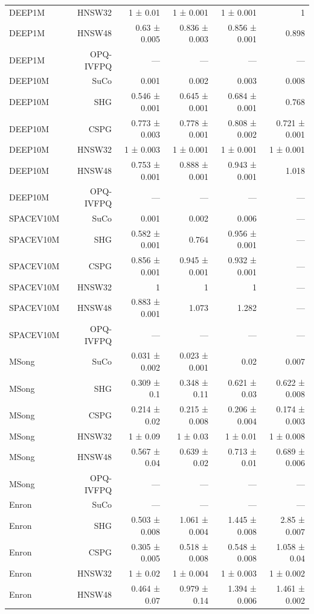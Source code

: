 \begin{table}[t]
\begin{tabular}{lrrrrr}
DEEP1M & HNSW32 & 1 ± 0.01 & 1 ± 0.001 & 1 ± 0.001 & 1 \\
DEEP1M & HNSW48 & 0.63 ± 0.005 & 0.836 ± 0.003 & 0.856 ± 0.001 & 0.898 \\
DEEP1M & OPQ-IVFPQ & — & — & — & — \\
DEEP10M & SuCo & 0.001 & 0.002 & 0.003 & 0.008 \\
DEEP10M & SHG & 0.546 ± 0.001 & 0.645 ± 0.001 & 0.684 ± 0.001 & 0.768 \\
DEEP10M & CSPG & 0.773 ± 0.003 & 0.778 ± 0.001 & 0.808 ± 0.002 & 0.721 ± 0.001 \\
DEEP10M & HNSW32 & 1 ± 0.003 & 1 ± 0.001 & 1 ± 0.001 & 1 ± 0.001 \\
DEEP10M & HNSW48 & 0.753 ± 0.001 & 0.888 ± 0.001 & 0.943 ± 0.001 & 1.018 \\
DEEP10M & OPQ-IVFPQ & — & — & — & — \\
SPACEV10M & SuCo & 0.001 & 0.002 & 0.006 & — \\
SPACEV10M & SHG & 0.582 ± 0.001 & 0.764 & 0.956 ± 0.001 & — \\
SPACEV10M & CSPG & 0.856 ± 0.001 & 0.945 ± 0.001 & 0.932 ± 0.001 & — \\
SPACEV10M & HNSW32 & 1 & 1 & 1 & — \\
SPACEV10M & HNSW48 & 0.883 ± 0.001 & 1.073 & 1.282 & — \\
SPACEV10M & OPQ-IVFPQ & — & — & — & — \\
MSong & SuCo & 0.031 ± 0.002 & 0.023 ± 0.001 & 0.02 & 0.007 \\
MSong & SHG & 0.309 ± 0.1 & 0.348 ± 0.11 & 0.621 ± 0.03 & 0.622 ± 0.008 \\
MSong & CSPG & 0.214 ± 0.02 & 0.215 ± 0.008 & 0.206 ± 0.004 & 0.174 ± 0.003 \\
MSong & HNSW32 & 1 ± 0.09 & 1 ± 0.03 & 1 ± 0.01 & 1 ± 0.008 \\
MSong & HNSW48 & 0.567 ± 0.04 & 0.639 ± 0.02 & 0.713 ± 0.01 & 0.689 ± 0.006 \\
MSong & OPQ-IVFPQ & — & — & — & — \\
Enron & SuCo & — & — & — & — \\
Enron & SHG & 0.503 ± 0.008 & 1.061 ± 0.004 & 1.445 ± 0.008 & 2.85 ± 0.007 \\
Enron & CSPG & 0.305 ± 0.005 & 0.518 ± 0.008 & 0.548 ± 0.008 & 1.058 ± 0.04 \\
Enron & HNSW32 & 1 ± 0.02 & 1 ± 0.004 & 1 ± 0.003 & 1 ± 0.002 \\
Enron & HNSW48 & 0.464 ± 0.07 & 0.979 ± 0.14 & 1.394 ± 0.006 & 1.461 ± 0.002 \\

\end{tabular}
\end{table}
